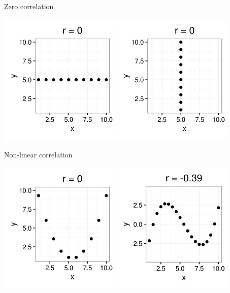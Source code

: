 \documentclass[xcolor=table, aspectratio=169, bigger]{beamer}
\begin{document}
\begin{frame}{Zero correlation}

{\centering
\includegraphics[width=2.25in]{../images/ch10_cor_zero}
\includegraphics[width=2.25in]{../images/ch10_cor_zerox}
\par}
\end{frame}

\begin{frame}{Non-linear correlation}

{\centering
\includegraphics[width=2.25in]{../images/ch10_cor_para}
\pause\includegraphics[width=2.25in]{../images/ch10_cor_cube}
\par}
\end{frame}
\end{document}
